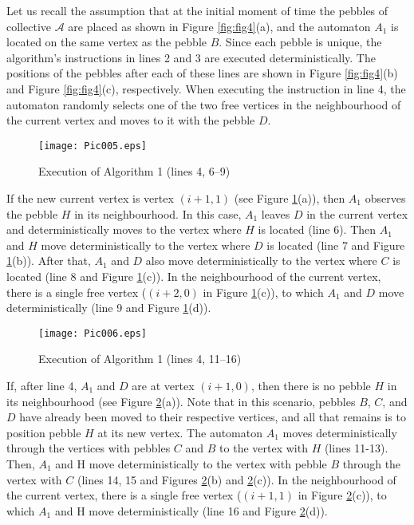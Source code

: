\documentclass{article}
\newenvironment{proof}[1][Proof]{\begin{trivlist}
\item[\hskip \labelsep {\bfseries #1}]}{\end{trivlist}}
\begin{document}
\begin{proof}
Let us recall the assumption that at the initial moment of time the pebbles of collective $\mathcal{A}$ are placed as shown in Figure \ref{fig:fig4}(a), and the automaton $A_{1}$ is located on the same vertex as the pebble $B$.
Since each pebble is unique, the algorithm's instructions in lines 2 and 3 are executed deterministically. 
The positions of the pebbles after each of these lines are shown in Figure \ref{fig:fig4}(b) and Figure \ref{fig:fig4}(c), respectively. 
When executing the instruction in line 4, the automaton randomly selects one of the two free vertices in the neighbourhood of the current vertex and moves to it with the pebble $D$.

\begin{figure}[h]
	\centering
	\texttt{[image: Pic005.eps]}
	\caption{Execution of Algorithm 1 (lines 4, 6--9)}
	\label{fig:fig5}
\end{figure}

If the new current vertex is vertex $(i+1, 1)$ (see Figure \ref{fig:fig5}(a)), then $A_{1}$ observes the pebble $H$ in its neighbourhood. 
In this case, $A_{1}$ leaves $D$ in the current vertex and deterministically moves to the vertex where $H$ is located (line 6). 
Then $A_{1}$ and $H$ move deterministically to the vertex where $D$ is located (line 7 and Figure \ref{fig:fig5}(b)). 
After that, $A_{1}$ and $D$ also move deterministically to the vertex where $C$ is located (line 8 and Figure \ref{fig:fig5}(c)). 
In the neighbourhood of the current vertex, there is a single free vertex ($(i+2, 0)$ in Figure \ref{fig:fig5}(c)), to which $A_{1}$ and $D$ move deterministically (line 9 and Figure \ref{fig:fig5}(d)).

\begin{figure}
	\centering
	\texttt{[image: Pic006.eps]}
	\caption{Execution of Algorithm 1 (lines 4, 11--16)}
	\label{fig:fig6}
\end{figure}

If, after line 4, $A_{1}$ and $D$ are at vertex $(i+1, 0)$, then there is no pebble $H$ in its neighbourhood (see Figure \ref{fig:fig6}(a)).
Note that in this scenario, pebbles $B$, $C$, and $D$ have already been moved to their respective vertices, and all that remains is to position pebble $H$ at its new vertex.
The automaton $A_{1}$ moves deterministically through the vertices with pebbles $C$ and $B$ to the vertex with $H$ (lines 11-13). 
Then, $A_{1}$ and H move deterministically to the vertex with pebble $B$ through the vertex with $C$ (lines 14, 15 and Figures \ref{fig:fig6}(b) and \ref{fig:fig6}(c)). 
In the neighbourhood of the current vertex, there is a single free vertex ($(i+1, 1)$ in Figure \ref{fig:fig6}(c)), to which $A_{1}$ and H move deterministically (line 16 and Figure \ref{fig:fig6}(d)).


\end{proof}
\end{document}
